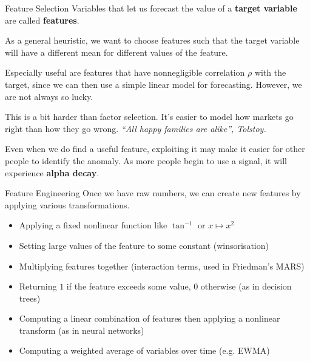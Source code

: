 \documentclass{beamer}
\begin{document}
\begin{frame}{Feature Selection}
	Variables that let us forecast the value of a \textbf{target variable} are called \textbf{features}.

	As a general heuristic, we want to choose features such that the target variable will have a different mean for different values of the feature.

	Especially useful are features that have nonnegligible correlation $\rho$ with the target, since we can then use a simple linear model for forecasting. However, we are not always so lucky.

	This is a bit harder than factor selection. It's easier to model how markets go right than how they go wrong. \textit{``All happy families are alike'', Tolstoy.}

	Even when we do find a useful feature, exploiting it may make it easier for other people to identify the anomaly. As more people begin to use a signal, it will experience \textbf{alpha decay}.
\end{frame}

\begin{frame}{Feature Engineering}
	Once we have raw numbers, we can create new features by applying various transformations.
	\begin{itemize}
		\item Applying a fixed nonlinear function like $\tan^{-1}$ or $x\mapsto x^2$
		\item Setting large values of the feature to some constant (winsorisation)
		\item Multiplying features together (interaction terms, used in Friedman's MARS)
		\item Returning $1$ if the feature exceeds some value, $0$ otherwise (as in decision trees)
		\item Computing a linear combination of features then applying a nonlinear transform (as in neural networks) 
		\item Computing a weighted average of variables over time (e.g. EWMA)
	\end{itemize}
\end{frame}
\end{document}
